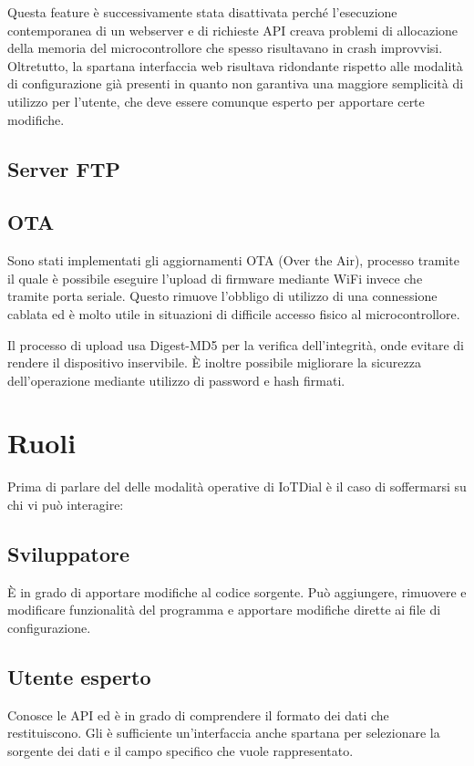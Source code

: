 \documentclass[12pt,a4paper]{report}
\begin{document}
Questa feature è successivamente stata disattivata perché l'esecuzione contemporanea di un webserver e di richieste API creava
problemi di allocazione della memoria del microcontrollore che spesso risultavano in crash improvvisi. Oltretutto, la spartana
interfaccia web risultava ridondante rispetto alle modalità di configurazione già presenti in quanto non garantiva una maggiore
semplicità di utilizzo per l'utente, che deve essere comunque esperto per apportare certe modifiche.

\subsection{Server FTP}

\subsection{OTA}
Sono stati implementati gli aggiornamenti OTA (Over the Air), processo tramite il quale è possibile eseguire l'upload di firmware
mediante WiFi invece che tramite porta seriale. Questo rimuove l'obbligo di utilizzo di una connessione cablata ed è molto utile
in situazioni di difficile accesso fisico al microcontrollore.

Il processo di upload usa Digest-MD5 per la verifica dell'integrità, onde evitare di rendere il dispositivo inservibile. È inoltre possibile
migliorare la sicurezza dell'operazione mediante utilizzo di password e hash firmati. \cite{espota}

\section{Ruoli}
Prima di parlare del delle modalità operative di IoTDial è il caso di soffermarsi su chi vi può interagire:
\subsection*{Sviluppatore}
È in grado di apportare modifiche al codice sorgente. Può aggiungere, rimuovere e  modificare funzionalità del programma
e apportare modifiche dirette ai file di configurazione.
\subsection*{Utente esperto}
Conosce le API ed è in grado di comprendere il formato dei dati che restituiscono. Gli è sufficiente un'interfaccia anche spartana
per selezionare la sorgente dei dati e il campo specifico che vuole rappresentato.
\end{document}
